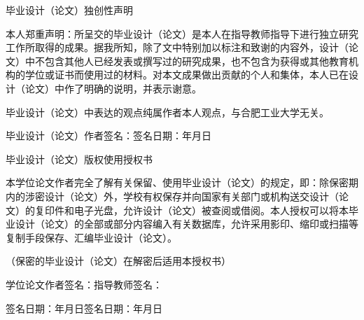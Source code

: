 \begin{titlepage}
\setlength{\parindent}{2em}
\setlength{\parskip}{0.5em}

{
\begin{center}
\heiti \Large
毕业设计（论文）独创性声明\vspace{1.2cm}
\end{center}
}

{
本人郑重声明：所呈交的毕业设计（论文）是本人在指导教师指导下进行独立研究工作所取得的成果。据我所知，除了文中特别加以标注和致谢的内容外，设计（论文）中不包含其他人已经发表或撰写过的研究成果，也不包含为获得或其他教育机构的学位或证书而使用过的材料。对本文成果做出贡献的个人和集体，本人已在设计（论文）中作了明确的说明，并表示谢意。

毕业设计（论文）中表达的观点纯属作者本人观点，与合肥工业大学无关。\vspace{1cm}

毕业设计（论文）作者签名：\hfill 签名日期：\hspace{2em}年\hspace{2em}月\hspace{2em}日
}

{
\vspace{3cm}
\begin{center}
\heiti \Large
毕业设计（论文）版权使用授权书\vspace{1.2cm}
\end{center}
}

{
本学位论文作者完全了解有关保留、使用毕业设计（论文）的规定，即：除保密期内的涉密设计（论文）外，学校有权保存并向国家有关部门或机构送交设计（论文）的复印件和电子光盘，允许设计（论文）被查阅或借阅。本人授权可以将本毕业设计（论文）的全部或部分内容编入有关数据库，允许采用影印、缩印或扫描等复制手段保存、汇编毕业设计（论文）。

（保密的毕业设计（论文）在解密后适用本授权书） \vspace{1.5cm}

学位论文作者签名：\hfill 指导教师签名：\hspace{7em}

签名日期：\hspace{2em}年\hspace{2em}月\hspace{2em}日\hfill 签名日期：\hspace{2em}年\hspace{2em}月\hspace{2em}日
}


\end{titlepage}
